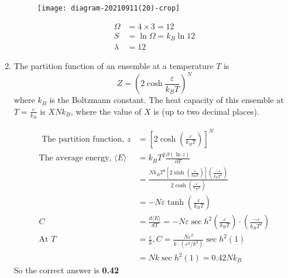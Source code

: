 \begin{enumerate}
	{}
	\begin{answer}$\left. \right. $
		\begin{figure}[H]
			\centering
			\texttt{[image: diagram-20210911(20)-crop]}
		\end{figure}
		\begin{align*}
		\Omega&=4 \times 3=12\\
		S&=\ln \Omega=k_{B} \ln 12\\
		\lambda&=12
		\end{align*}
	\end{answer}
	\item The partition function of an ensemble at a temperature $T$ is
	$$
	Z=\left(2 \cosh \frac{\varepsilon}{k_{B} T}\right)^{N}
	$$
	where $k_{B}$ is the Boltzmann constant. The heat capacity of this ensemble at $T=\frac{\varepsilon}{k_{B}}$ is $X N k_{B}$, where the value of $X$ is (up to two decimal places).
	{}
\begin{answer}
	\begin{align*}
	\text{	The partition function, }z&=\left[2 \cosh \left(\frac{\varepsilon}{k_{B} T}\right)\right]^{N}\\
	\text{The average energy, }\langle E\rangle&=k_{B} T^{2} \frac{\partial(\ln z)}{\partial T}\\
	&=\frac{N k_{B} T^{2}\left[2 \sinh \left(\frac{\varepsilon}{k_{B} T}\right)\right]\left(\frac{-\varepsilon}{k_{B} T^{2}}\right)}{2 \cosh \left(\frac{\varepsilon}{k_{B} T}\right)}\\&=-N \varepsilon \tanh \left(\frac{\varepsilon}{k_{B} T}\right)\\
	C&=\frac{d\langle E\rangle}{d T}=-N \varepsilon \sec h^{2}\left(\frac{\varepsilon}{k_{B} T}\right) \cdot\left(\frac{-\varepsilon}{k_{B} T^{2}}\right)\\
	\text{At }T&=\frac{\varepsilon}{k}, C=\frac{N \varepsilon^{2}}{k \cdot\left(\varepsilon^{2} / k^{2}\right)} \sec h^{2}(1)\\&=N k \sec h^{2}(1)=0.42 N k_{B}
	\end{align*}
		So the correct answer is \textbf{0.42}
\end{answer}
\end{enumerate}	
\setlength\arrayrulewidth{1pt}
